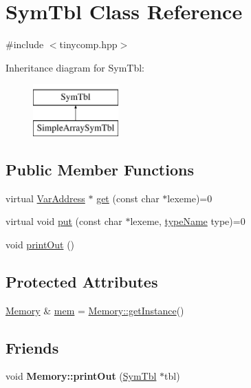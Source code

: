 \hypertarget{class_sym_tbl}{}\section{Sym\+Tbl Class Reference}
\label{class_sym_tbl}


{\ttfamily \#include $<$tinycomp.\+hpp$>$}

Inheritance diagram for Sym\+Tbl\+:\begin{figure}[H]
\begin{center}
\leavevmode
\includegraphics[height=2.000000cm]{class_sym_tbl}
\end{center}
\end{figure}
\subsection*{Public Member Functions}
\begin{DoxyCompactItemize}
\item 
virtual \hyperlink{class_var_address}{Var\+Address} $\ast$ \hyperlink{class_sym_tbl_a7cdd50cd38f3eecf23c9e6ce0c1696da}{get} (const char $\ast$lexeme)=0
\item 
virtual void \hyperlink{class_sym_tbl_a116640842b4776c1bacc6292b3015078}{put} (const char $\ast$lexeme, \hyperlink{tinycomp_8h_aca554671f4620139c1393f96d2af74bc}{type\+Name} type)=0
\item 
void \hyperlink{class_sym_tbl_a97e36880f52532dfac7367b2034e3346}{print\+Out} ()
\end{DoxyCompactItemize}
\subsection*{Protected Attributes}
\begin{DoxyCompactItemize}
\item 
\hyperlink{class_memory}{Memory} \& \hyperlink{class_sym_tbl_aacdfc3edb6f9bd947ea5bc7b5b695757}{mem} = \hyperlink{class_memory_a96eac3970b3baba973645a9cc32aee4c}{Memory\+::get\+Instance}()
\end{DoxyCompactItemize}
\subsection*{Friends}
\begin{DoxyCompactItemize}
\item 
void {\bfseries Memory\+::print\+Out} (\hyperlink{class_sym_tbl}{Sym\+Tbl} $\ast$tbl)\hypertarget{class_sym_tbl_ad9233821b14854177e4680a1ccad4f29}{}\label{class_sym_tbl_ad9233821b14854177e4680a1ccad4f29}

\end{DoxyCompactItemize}


